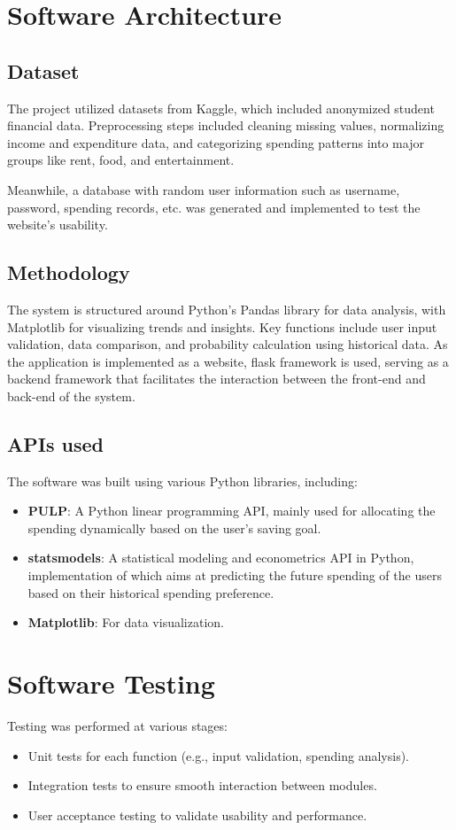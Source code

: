 \documentclass{article}
\begin{document}
\section{Software Architecture}

\subsection{Dataset}
The project utilized datasets from Kaggle, which included anonymized student financial data. Preprocessing steps included cleaning missing values, normalizing income and expenditure data, and categorizing spending patterns into major groups like rent, food, and entertainment. 
\par Meanwhile, a database with random user information such as username, password, spending records, etc. was generated and implemented to test the website's usability.

\subsection{Methodology}
The system is structured around Python's Pandas library for data analysis, with Matplotlib for visualizing trends and insights. Key functions include user input validation, data comparison, and probability calculation using historical data. As the application is implemented as a website, flask framework is used, serving as a backend framework that facilitates the interaction between the front-end and back-end of the system.

\subsection{APIs used}
The software was built using various Python libraries, including: 
\begin{itemize} 
    \item \textbf{PULP}: A Python linear programming API, mainly used for allocating the spending dynamically based on the user's saving goal.
    \item \textbf{statsmodels}: A statistical modeling and econometrics API in Python, implementation of which aims at predicting the future spending of the users based on their historical spending preference.
    \item \textbf{Matplotlib}: For data visualization.
\end{itemize}


\section{Software Testing}
Testing was performed at various stages: \begin{itemize} \item Unit tests for each function (e.g., input validation, spending analysis). \item Integration tests to ensure smooth interaction between modules. \item User acceptance testing to validate usability and performance. \end{itemize}
\end{document}
